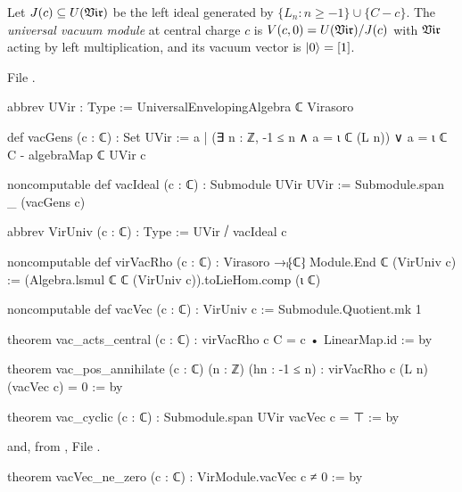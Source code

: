 \begin{definition}\label{l02:def:viruniv}
Let $J(c)\subseteq U(\mathfrak{Vir})$ be the left ideal generated by $\{L_n : n\ge -1\}\cup\{C-c\}$. The
\emph{universal vacuum module} at central charge $c$ is $V(c,0) = U(\mathfrak{Vir})/J(c)$ with
$\mathfrak{Vir}$ acting by left multiplication, and its vacuum vector is $|0\rangle = [1]$.
\end{definition}

File .
\begin{leancode}
abbrev UVir : Type := UniversalEnvelopingAlgebra ℂ Virasoro

def vacGens (c : ℂ) : Set UVir :=
  {a | (∃ n : ℤ, -1 ≤ n ∧ a = ι ℂ (L n)) ∨ a = ι ℂ C - algebraMap ℂ UVir c}

noncomputable def vacIdeal (c : ℂ) : Submodule UVir UVir :=
  Submodule.span _ (vacGens c)

abbrev VirUniv (c : ℂ) : Type := UVir ⧸ vacIdeal c

noncomputable def virVacRho (c : ℂ) : Virasoro →ₗ⁅ℂ⁆ Module.End ℂ (VirUniv c) :=
  (Algebra.lsmul ℂ ℂ (VirUniv c)).toLieHom.comp (ι ℂ)

noncomputable def vacVec (c : ℂ) : VirUniv c := Submodule.Quotient.mk 1

theorem vac_acts_central (c : ℂ) : virVacRho c C = c • LinearMap.id := by

theorem vac_pos_annihilate (c : ℂ) (n : ℤ) (hn : -1 ≤ n) :
    virVacRho c (L n) (vacVec c) = 0 := by

theorem vac_cyclic (c : ℂ) :
    Submodule.span UVir {vacVec c} = ⊤ := by
\end{leancode}
and, from ,
File .
\begin{leancode}
theorem vacVec_ne_zero (c : ℂ) : VirModule.vacVec c ≠ 0 := by
\end{leancode}

